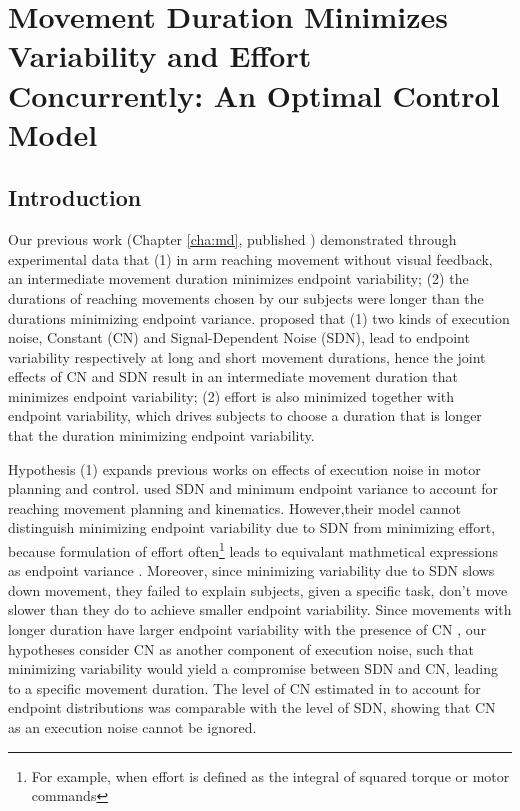 \chapter{Movement Duration Minimizes Variability and Effort Concurrently: An Optimal Control Model}
\label{cha:ocmd}

\section{Introduction}
Our previous work (Chapter \ref{cha:md}, published \cite{Wang2016}) demonstrated through experimental data that 
(1) in arm reaching movement without visual feedback, an intermediate movement duration minimizes endpoint variability; 
(2) the durations of reaching movements chosen by our subjects were longer than the durations minimizing endpoint variance. 
\cite{Wang2016} proposed that 
(1) two kinds of execution noise, Constant (CN) and Signal-Dependent Noise (SDN), lead to endpoint variability respectively at long and short movement durations, hence the joint effects of CN and SDN result in an intermediate movement duration that minimizes endpoint variability;
(2) effort is also minimized together with endpoint variability, which drives subjects to choose a duration that is longer that the duration minimizing endpoint variability.

Hypothesis (1) expands previous works on effects of execution noise in motor planning and control.
\cite{Harris1998, Harris2006} used SDN and minimum endpoint variance to account for reaching movement planning and kinematics. 
However,their model cannot distinguish minimizing endpoint variability due to SDN from minimizing effort, because formulation of effort often\footnote{For example, when effort is defined as the integral of squared torque or motor commands} leads to equivalant mathmetical expressions as endpoint variance \cite{Wang2016, OSullivan2009}. 
Moreover, since minimizing variability due to SDN slows down movement, they failed to explain subjects, given a specific task, don't move slower than they do to achieve smaller endpoint variability.
Since movements with longer duration have larger endpoint variability with the presence of CN \cite{Todorov2005}, our hypotheses consider CN as another component of execution noise, such that minimizing variability would yield a compromise between SDN and CN, leading to a specific movement duration. 
The level of CN estimated in \cite{VanBeers2004} to account for endpoint distributions was comparable with the level of SDN, showing that CN as an execution noise cannot be ignored.

